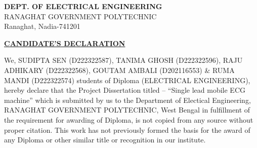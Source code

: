 \documentclass[12pt,a4paper]{report}
\begin{document}
\begin{center}


\begin{center}
\textbf{DEPT. OF ELECTRICAL ENGINEERING}\\

RANAGHAT GOVERNMENT POLYTECHNIC \\

Ranaghat, Nadia-741201\\
\end{center}
\vspace{2 cm}
\textbf{\underline{CANDIDATE’S DECLARATION}}\\
\end{center}
\vspace{1.2cm}
We, SUDIPTA SEN (D222322587), TANIMA GHOSH (D222322596), RAJU ADHIKARY (D222322568), GOUTAM AMBALI (D202116553) \& RUMA MANDI (D222322574) students of Diploma (ELECTRICAL ENGINEERING), hereby declare that the Project Dissertation titled -- “Single lead mobile ECG machine” which is submitted by us to the Department of Electical Engineering, RANAGHAT GOVERNMENT POLYTECHNIC, West Bengal in fulfillment of the requirement for awarding of Diploma, is not copied from any source without proper citation. This work has not previously formed the basis for the award of any Diploma or other similar title or recognition in our institute.


\end{document}
